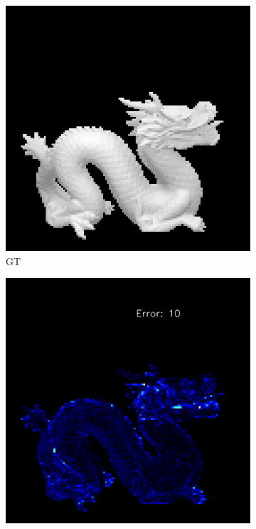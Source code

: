 \begin{figure}
	
	\begin{subfigure}[b]{0.18\linewidth}
		\includegraphics[width=\linewidth]{./Figures/gcnn_synthetic/fancy_eval_7_img.png}
		\caption{GT}
	\end{subfigure}
	\begin{subfigure}[b]{0.18\linewidth}
		\includegraphics[width=\linewidth]{./Figures/gcnn_synthetic/fancy_eval_7_error_f1.png}

\end{subfigure}
\end{figure}
